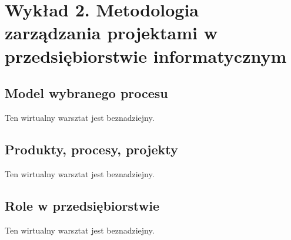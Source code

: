\chapter{Wykład 2. Metodologia zarządzania projektami w przedsiębiorstwie informatycznym}

\section{Model wybranego procesu}

Ten wirtualny warsztat jest beznadziejny.


\section{Produkty, procesy, projekty}

Ten wirtualny warsztat jest beznadziejny.


\section{Role w przedsiębiorstwie}

Ten wirtualny warsztat jest beznadziejny.


